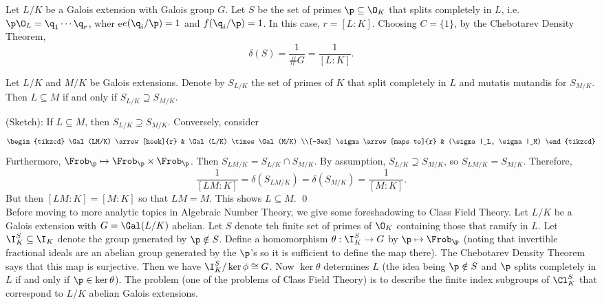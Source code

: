 \begin{ex}
Let $L/K$ be a Galois extension with Galois group $G$. Let $S$ be the set of primes $\p \subseteq \O_K$ that splits completely in $L$, i.e. $\p\O_L=\q_1\cdots \q_r$, wher e$e(\q_i/\p)=1$ and $f(\q_i/\p)=1$. In this case, $r=[L \colon K]$. Choosing $C=\{1\}$, by the Chebotarev Density Theorem,
	\[
	\delta(S)= \dfrac{1}{\#G}= \dfrac{1}{[L \colon K]}. 
	\] \xqed
\end{ex}


\begin{prop}
Let $L/K$ and $M/K$ be Galois extensions. Denote by $S_{L/K}$ the set of primes of $K$ that split completely in $L$ and mutatis mutandis for $S_{M/K}$. Then $L \subseteq M$ if and only if $S_{L/K} \supseteq S_{M/K}$.
\end{prop}

\pf (Sketch): If $L \subseteq M$, then $S_{L/K} \supseteq S_{M/K}$. Conversely, consider
	\[
	\begin{tikzcd}
	\Gal(LM/K) \arrow[hook]{r} & \Gal(L/K) \times \Gal(M/K) \\[-3ex]
	\sigma \arrow[maps to]{r} & (\sigma|_L, \sigma|_M)
	\end{tikzcd}
	\]
Furthermore, $\Frob_\p \mapsto \Frob_\p \times \Frob_\p$. Then $S_{LM/K}= S_{L/K} \cap S_{M/K}$. By assumption, $S_{L/K} \supseteq S_{M/K}$, so $S_{LM/K}= S_{M/K}$. Therefore,
	\[
	\dfrac{1}{[LM \colon K]} = \delta(S_{LM/K})= \delta(S_{M/K})= \dfrac{1}{[M \colon K]}.
	\]
But then $[LM \colon K]=[M \colon K]$ so that $LM=M$. This shows $L \subseteq M$. \qed \\


Before moving to more analytic topics in Algebraic Number Theory, we give some foreshadowing to Class Field Theory. Let $L/K$ be a Galois extension with $G=\Gal(L/K)$ abelian. Let $S$ denote teh finite set of primes of $\O_K$ containing those that ramify in $L$. Let $\I_K^S \subseteq \I_K$ denote the group generated by $\p \notin S$. Define a homomorphism $\theta: \I_K^S \to G$ by $\p \mapsto \Frob_\p$ (noting that invertible fractional ideals are an abelian group generated by the $\p$'s so it is sufficient to define the map there). The Chebotarev Density Theorem says that this map is surjective. Then we have $\I_K^S/\ker \phi \cong G$. Now $\ker \theta$ determines $L$ (the idea being $\p \notin S$ and $\p$ splits completely in $L$ if and only if $\p \in \ker \theta$). The problem (one of the problems of Class Field Theory) is to describe the finite index subgroups of $\Cl_K^S$ that correspond to $L/K$ abelian Galois extensions. 





















